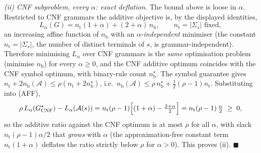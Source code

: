 \documentclass[
]{article}
\begin{document}
\emph{(ii) CNF subproblem, every $\alpha$: exact deflation.} The bound
above is loose in $\alpha$. Restricted to CNF grammars the additive
objective is, by the displayed identities,
\begin{equation}
L_\alpha(G) = n_{\mathrm{t}}(1+\alpha) + (2+\alpha)\,n_{\mathrm{b}},
\qquad n_{\mathrm{t}} = |\Sigma_s| \text{ fixed}, \tag{AFF}
\end{equation}
an increasing affine function of $n_{\mathrm{b}}$ with an
$\alpha$-\emph{independent} minimiser (the constant $n_{\mathrm{t}} =
|\Sigma_s|$, the number of distinct terminals of $s$, is
grammar-independent). Therefore minimising $L_\alpha$ over CNF grammars
is the \emph{same} optimisation problem (minimise $n_{\mathrm{b}}$) for
every $\alpha \geq 0$, and the CNF additive optimum coincides with the
CNF symbol optimum, with binary-rule count $n_{\mathrm{b}}^\star$. The
symbol guarantee gives $n_{\mathrm{t}} + 2n_{\mathrm{b}}(\mathcal A) \leq
\rho(n_{\mathrm{t}} + 2n_{\mathrm{b}}^\star)$, i.e.\
$n_{\mathrm{b}}(\mathcal A) \leq \rho\,n_{\mathrm{b}}^\star +
\tfrac12(\rho-1)n_{\mathrm{t}}$. Substituting into (AFF),
\[
\rho\,L_\alpha(G^\star_{\mathrm{CNF}}) - L_\alpha(\mathcal A(s))
= n_{\mathrm{t}}(\rho-1)\Bigl[(1+\alpha) - \tfrac{2+\alpha}{2}\Bigr]
= n_{\mathrm{t}}(\rho-1)\,\tfrac{\alpha}{2} \;\geq\; 0,
\]
so the additive ratio against the CNF optimum is at most $\rho$ for all
$\alpha$, with slack $n_{\mathrm{t}}(\rho-1)\alpha/2$ that \emph{grows}
with $\alpha$ (the approximation-free constant term
$n_{\mathrm{t}}(1+\alpha)$ deflates the ratio strictly below $\rho$ for
$\alpha > 0$). This proves (ii). \hfill$\blacksquare$
\end{document}
